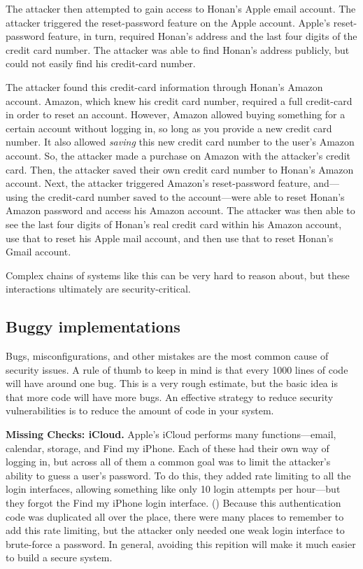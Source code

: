 \documentclass[
  letterpaper,
]{scrbook}
\theoremstyle{definition}
\theoremstyle{plain}
\theoremstyle{plain}
\theoremstyle{remark}
\begin{document}
The attacker then attempted to gain access to Honan's Apple email
account. The attacker triggered the reset-password feature on the Apple
account. Apple's reset-password feature, in turn, required Honan's
address and the last four digits of the credit card number. The attacker
was able to find Honan's address publicly, but could not easily find his
credit-card number.

The attacker found this credit-card information through Honan's Amazon
account. Amazon, which knew his credit card number, required a full
credit-card in order to reset an account. However, Amazon allowed buying
something for a certain account without logging in, so long as you
provide a new credit card number. It also allowed \emph{saving} this new
credit card number to the user's Amazon account. So, the attacker made a
purchase on Amazon with the attacker's credit card. Then, the attacker
saved their own credit card number to Honan's Amazon account. Next, the
attacker triggered Amazon's reset-password feature, and---using the
credit-card number saved to the account---were able to reset Honan's
Amazon password and access his Amazon account. The attacker was then
able to see the last four digits of Honan's real credit card within his
Amazon account, use that to reset his Apple mail account, and then use
that to reset Honan's Gmail account.

Complex chains of systems like this can be very hard to reason about,
but these interactions ultimately are security-critical.

\subsection{Buggy implementations}\label{buggy-implementations}

Bugs, misconfigurations, and other mistakes are the most common cause of
security issues. A rule of thumb to keep in mind is that every 1000
lines of code will have around one bug. This is a very rough estimate,
but the basic idea is that more code will have more bugs. An effective
strategy to reduce security vulnerabilities is to reduce the amount of
code in your system.

\textbf{Missing Checks: iCloud.} Apple's iCloud performs many
functions---email, calendar, storage, and Find my iPhone. Each of these
had their own way of logging in, but across all of them a common goal
was to limit the attacker's ability to guess a user's password. To do
this, they added rate limiting to all the login interfaces, allowing
something like only 10 login attempts per hour---but they forgot the
Find my iPhone login interface. ()
Because this authentication code was duplicated all over the place,
there were many places to remember to add this rate limiting, but the
attacker only needed one weak login interface to brute-force a password.
In general, avoiding this repition will make it much easier to build a
secure system.
\end{document}
